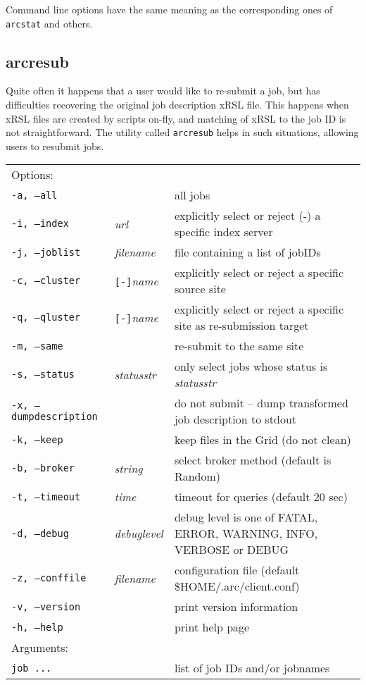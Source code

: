 Command line options have the same meaning as the corresponding ones of \verb#arcstat# and others.


\subsection{arcresub}
\label{sec:arcresub}

Quite often it happens that a user would like to re-submit a job, but
has difficulties recovering the original job description xRSL file.
This happens when xRSL files are created by scripts on-fly, and
matching of xRSL to the job ID is not straightforward. The utility
called \texttt{arcresub} helps
in such situations, allowing users to resubmit jobs.

\hspace*{0.5cm}
\begin{shaded}
\end{shaded}
\begin{longtable}{llp{8cm}}
   Options:&&\\
   \texttt{-a, --all}& & all jobs\\
   \texttt{-i, --index}&\textit{url}&explicitly select or reject (-) a specific index server\\
   \texttt{-j, --joblist}& \textit{filename} & file containing a list of jobIDs\\
   \texttt{-c, --cluster}&\verb#[-]#\textit{name}&explicitly select or reject a specific source site\\
   \texttt{-q, --qluster}&\verb#[-]#\textit{name}&explicitly select or reject a specific site as re-submission target\\
   \texttt{-m, --same}& &re-submit to the same site\\
   \texttt{-s, --status}& \textit{statusstr} &only select jobs whose status is \textit{statusstr}\\
   \texttt{-x, --dumpdescription}&&do not submit -- dump transformed job description to stdout\\
   \texttt{-k, --keep}& & keep files in the Grid (do not clean)\\
   \texttt{-b, --broker}&\textit{string}&select broker method (default is Random)\\
   \texttt{-t, --timeout}& \textit{time} & timeout for queries (default 20 sec)\\
   \texttt{-d, --debug}& \textit{debuglevel}&debug level is one of  FATAL, ERROR, WARNING, INFO, VERBOSE or DEBUG\\
   \texttt{-z, --conffile}&\textit{filename}& configuration file (default {\$}HOME/.arc/client.conf)\\
   \texttt{-v, --version}& & print version information\\
   \texttt{-h, --help}& & print help page\\
   Arguments:&&\\
   \texttt{job ...} && list of job IDs and/or jobnames\\
\end{longtable}

